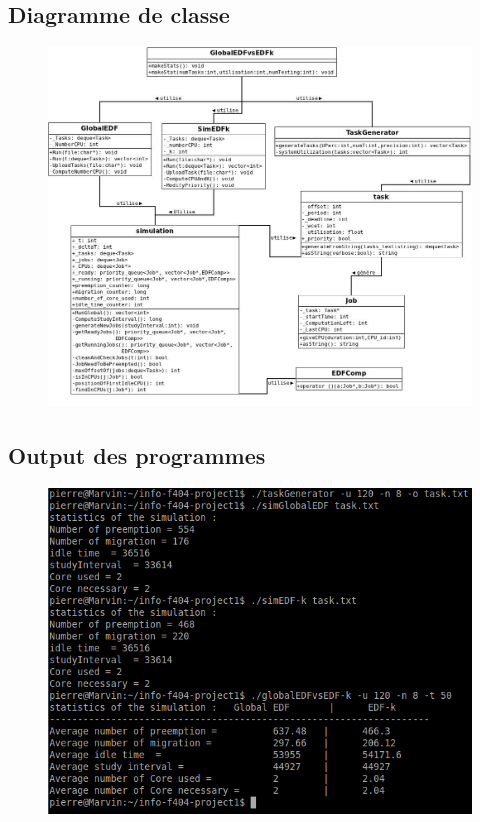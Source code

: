\documentclass[a4paper,10pt]{article}
\begin{document}
	
	  	
	 \subsection{Diagramme de classe}
		\begin{figure}[H] \hspace*{-2cm} 
    	\centering
   		  \includegraphics[width=500pt]{DiagUML.jpeg} 
	  	\end{figure}
	  
	 \subsection{Output des programmes}
		\begin{figure}[H] \hspace*{-2cm} 
    	\centering
   		  \includegraphics[width=350pt]{output4.png} 
	  	\end{figure}
	  	
\end{document}
